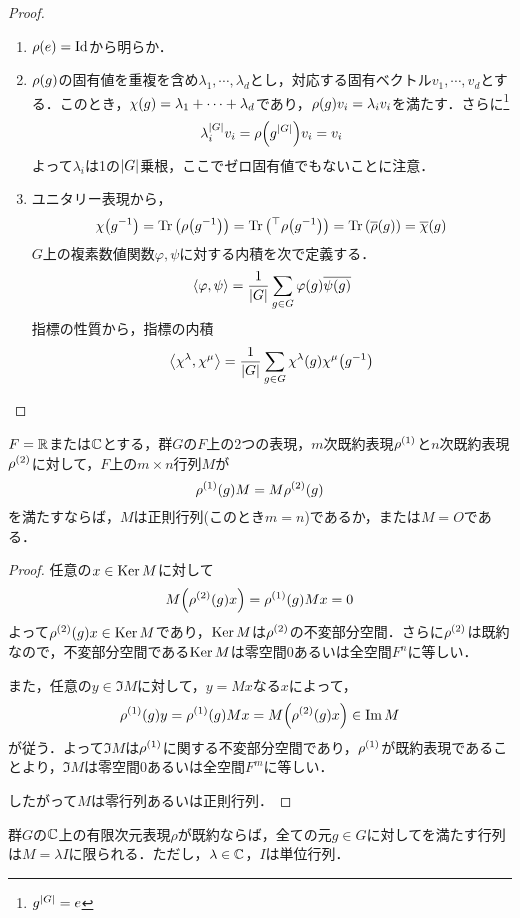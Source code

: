 \documentclass[main]{subfiles}
\begin{document}
	\begin{proof}
		\begin{enumerate}
			\item $\rho\qty(e)=\text{Id}$から明らか．
			\item $\rho\qty(g)$の固有値を重複を含め$\lambda_1,\cdots,\lambda_d$とし，対応する固有ベクトル$v_1,\cdots,v_d$とする．このとき，$\chi\qty(g)=\lambda_1+\cdots+\lambda_d$であり，$\rho\qty(g)v_i=\lambda_iv_i$を満たす．さらに\footnote{$g^\qty|G|=e$}\[\lambda_i^\qty|G|v_i=\rho\qty(g^\qty|G|)v_i=v_i\]よって$\lambda_i$は1の$\qty|G|$乗根，ここでゼロ固有値でもないことに注意．
			\item ユニタリー表現から，\[\chi\qty(g^{-1})=\Tr\qty(\rho\qty(g^{-1}))=\Tr\qty(^{\top}\rho\qty(g^{-1}))=\Tr\qty(\overline{\rho}\qty(g))=\overline{\chi}\qty(g)\]$G$上の複素数値関数$\varphi,\psi$に対する内積を次で定義する．\[\left<\varphi,\psi\right>=\frac{1}{\qty|G|}\sum_{g\in G}\varphi\qty(g)\overline{\psi\qty(g)}\]指標の性質から，指標の内積\[\left<\chi^\lambda,\chi^\mu\right>=\frac{1}{\qty|G|}\sum_{g\in G}\chi^\lambda\qty(g)\chi^\mu\qty(g^{-1})\]
		\end{enumerate}
	\end{proof}
	\begin{lem}[Schurの補題1]
		$F=\mathbb{R}$または$\mathbb{C}$とする，群$G$の$F$上の2つの表現，$m$次既約表現$\rho^\qty(1)$と$n$次既約表現$\rho^\qty(2)$に対して，$F$上の$m\times n$行列$M$が
		\[\rho^\qty(1)\qty(g)M=M\rho^\qty(2)\qty(g)\]
		を満たすならば，$M$は正則行列(このとき$m=n$)であるか，または$M=O$である．
	\end{lem}
	\begin{proof}
		任意の$x\in\operatorname{Ker} M$に対して
		\[M\qty(\rho^\qty(2)\qty(g)x)=\rho^\qty(1)\qty(g)Mx=0\]
		よって$\rho^\qty(2)\qty(g)x\in\operatorname{Ker} M$であり，$\operatorname{Ker} M$は$\rho^\qty(2)$の不変部分空間．さらに$\rho^\qty(2)$は既約なので，不変部分空間である$\operatorname{Ker} M$は零空間$\qty{0}$あるいは全空間$F^n$に等しい．

		また，任意の$y\in\Im M$に対して，$y=Mx$なる$x$によって，
		\[\rho^\qty(1)\qty(g)y=\rho^\qty(1)\qty(g)Mx=M\qty(\rho^\qty(2)\qty(g)x)\in\Im M\]
		が従う．よって$\Im M$は$\rho^\qty(1)$に関する不変部分空間であり，$\rho^\qty(1)$が既約表現であることより，$\Im M$は零空間$\qty{0}$あるいは全空間$F^m$に等しい．

		したがって$M$は零行列あるいは正則行列．
	\end{proof}
	\begin{lem}[Schurの補題2]
		群$G$の$\mathbb{C}$上の有限次元表現$\rho$が既約ならば，全ての元$g\in G$に対してを満たす行列は$M=\lambda I$に限られる．ただし，$\lambda\in\mathbb{C}$，$I$は単位行列．
	\end{lem}
\end{document}
